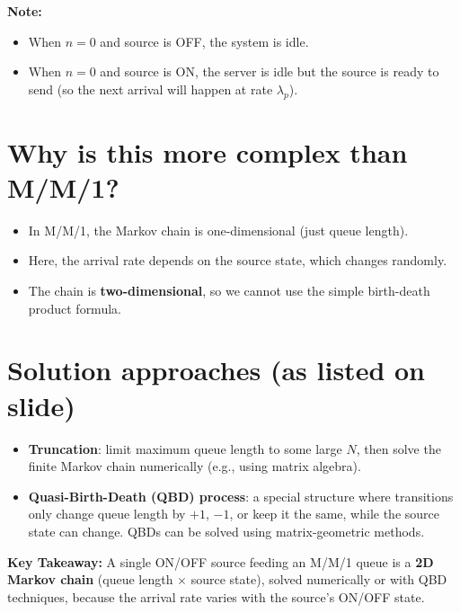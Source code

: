 \noindent
\textbf{Note:} 
\begin{itemize}
    \item When \(n = 0\) and source is OFF, the system is idle.
    \item When \(n = 0\) and source is ON, the server is idle but the source is ready to send (so the next arrival will happen at rate \(\lambda_p\)).
\end{itemize}

\section*{Why is this more complex than M/M/1?}

\begin{itemize}
    \item In M/M/1, the Markov chain is one-dimensional (just queue length).
    \item Here, the arrival rate depends on the source state, which changes randomly.
    \item The chain is \textbf{two-dimensional}, so we cannot use the simple birth-death product formula.
\end{itemize}

\section*{Solution approaches (as listed on slide)}

\begin{itemize}
    \item \textbf{Truncation}: limit maximum queue length to some large \(N\), then solve the finite Markov chain numerically (e.g., using matrix algebra).
    \item \textbf{Quasi-Birth-Death (QBD) process}: a special structure where transitions only change queue length by \(+1\), \(-1\), or keep it the same, while the source state can change. QBDs can be solved using matrix-geometric methods.
\end{itemize}

\begin{mdframed}[backgroundcolor=lightgray, linewidth=0pt, innertopmargin=8pt,
innerbottommargin=8pt]
\textbf{Key Takeaway:}
A single ON/OFF source feeding an M/M/1 queue is a \textbf{2D Markov chain} (queue length \(\times\) source state), solved numerically or with QBD techniques, because the arrival rate varies with the source's ON/OFF state.
\end{mdframed}

